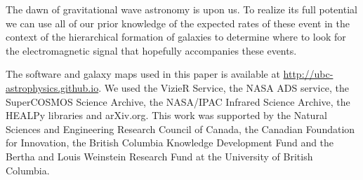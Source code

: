 \documentclass[useAMS,usenatbib]{mn2e}
\begin{document}
The dawn of gravitational wave astronomy is upon us.  To realize its
full potential we can use all of our prior knowledge of the expected
rates of these event in the context of the hierarchical formation of
galaxies to determine where to look for the electromagnetic signal
that hopefully accompanies these events.


The software and galaxy maps used in this paper is available at
\url{http://ubc-astrophysics.github.io}.  We used the VizieR Service,
the NASA ADS service, the SuperCOSMOS Science Archive, the NASA/IPAC
Infrared Science Archive, the HEALPy libraries and arXiv.org. This work
was supported by the Natural Sciences and Engineering Research Council
of Canada, the Canadian Foundation for Innovation, the British
Columbia Knowledge Development Fund and the Bertha and Louis Weinstein
Research Fund at the University of British Columbia.






\label{lastpage}
\end{document}
